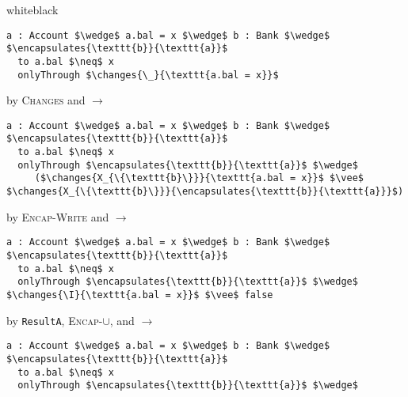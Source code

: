 \documentclass[acmsmall,review,anonymous]{acmart}\settopmatter{printfolios=true,printccs=false,printacmref=false}
\begin{document}
\begin{proofBox}{white}{black}
\footnotesize
\begin{minipage}{0.75\textwidth}
\begin{lstlisting}[language = Chainmail, mathescape=true, frame=single]
a : Account $\wedge$ a.bal = x $\wedge$ b : Bank $\wedge$ $\encapsulates{\texttt{b}}{\texttt{a}}$
  to a.bal $\neq$ x
  onlyThrough $\changes{\_}{\texttt{a.bal = x}}$
\end{lstlisting}
\end{minipage}
\begin{minipage}{0.24\textwidth}
\scriptsize
\hfill by \textsc{Changes} and $\longrightarrow$
\end{minipage}
\begin{minipage}{0.75\textwidth}
\begin{lstlisting}[language = Chainmail, mathescape=true]
a : Account $\wedge$ a.bal = x $\wedge$ b : Bank $\wedge$ $\encapsulates{\texttt{b}}{\texttt{a}}$
  to a.bal $\neq$ x
  onlyThrough $\encapsulates{\texttt{b}}{\texttt{a}}$ $\wedge$ 
     ($\changes{X_{\{\texttt{b}\}}}{\texttt{a.bal = x}}$ $\vee$ $\changes{X_{\{\texttt{b}\}}}{\encapsulates{\texttt{b}}{\texttt{a}}}$)
\end{lstlisting}
\end{minipage}
\begin{minipage}{0.24\textwidth}
\scriptsize
\hfill by \textsc{Encap-Write} and $\longrightarrow$
\end{minipage}
\begin{minipage}{0.75\textwidth}
\begin{lstlisting}[language = Chainmail, mathescape=true]
a : Account $\wedge$ a.bal = x $\wedge$ b : Bank $\wedge$ $\encapsulates{\texttt{b}}{\texttt{a}}$
  to a.bal $\neq$ x
  onlyThrough $\encapsulates{\texttt{b}}{\texttt{a}}$ $\wedge$ $\changes{\I}{\texttt{a.bal = x}}$ $\vee$ false
\end{lstlisting}
\end{minipage}
\begin{minipage}{0.24\textwidth}
\scriptsize
\hfill by \texttt{ResultA}, \textsc{Encap-}$\cup$, and $\longrightarrow$
\end{minipage}
\begin{minipage}{0.75\textwidth}
\begin{lstlisting}[language = Chainmail, mathescape=true]
a : Account $\wedge$ a.bal = x $\wedge$ b : Bank $\wedge$ $\encapsulates{\texttt{b}}{\texttt{a}}$
  to a.bal $\neq$ x
  onlyThrough $\encapsulates{\texttt{b}}{\texttt{a}}$ $\wedge$ 

\end{lstlisting}
\end{minipage}
\end{proofBox}
\end{document}
